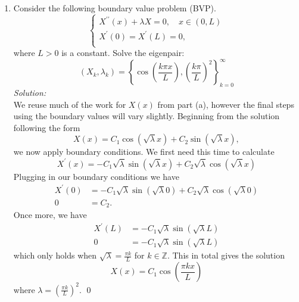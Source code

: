 \documentclass[10pt]{amsart}
\theoremstyle{nonumberplain}
\begin{document}
\begin{enumerate}[label={\bf {\arabic*}:}]
\begin{enumerate}
\item Consider the following boundary value problem (BVP). \\
$$
\begin{cases}
X^{\prime\prime}(x) + \lambda X = 0, \quad x \in (0, L) \\
X^\prime(0)  = X^\prime(L) = 0, \\
\end{cases}
$$
where $L > 0$ is a constant.
Solve the eigenpair:
$$
(X_k, \lambda_k) = \left\{ \cos \left( \frac {k \pi x}{L} \right), \left(\frac {k \pi}{L} \right)^2 \right\}_{k=0}^\infty
$$
\textit{Solution:} \\
We reuse much of the work for $X(x)$ from part (a), however the final steps using the boundary values will vary slightly.
Beginning from the solution following the form
$$
X(x) = C_1 \cos(\sqrt \lambda x) + C_2 \sin(\sqrt \lambda x),
$$
we now apply boundary conditions.
We first need this time to calculate
$$
X^\prime(x) = - C_1 \sqrt \lambda \sin(\sqrt \lambda x) + C_2 \sqrt \lambda \cos(\sqrt \lambda x)
$$
Plugging in our boundary conditions we have
\begin{align*}
X^\prime(0) &= - C_1 \sqrt \lambda \sin(\sqrt \lambda 0) + C_2 \sqrt \lambda \cos(\sqrt \lambda 0) \\
0 &= C_2.
\end{align*}
Once more, we have
\begin{align*}
X^\prime(L) &= - C_1 \sqrt \lambda \sin(\sqrt \lambda L) \\
0 &= - C_1 \sqrt \lambda \sin(\sqrt \lambda L)
\end{align*}
which only holds when $\sqrt \lambda = \frac {\pi k} L $ for $k \in \mathbb Z$.
This in total gives the solution
$$
X(x) = C_1 \cos \left(\frac {\pi k x} L \right)
$$
where $\lambda = \left ( \frac {\pi k } L \right )^2$.
\qed \\

\end{enumerate}

\newpage


\end{enumerate}
\end{document}
